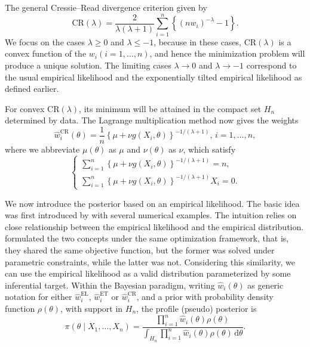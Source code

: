 \documentclass[oneside,english]{amsbook}
\numberwithin{section}{chapter}
\numberwithin{equation}{section}
\numberwithin{figure}{section}
\theoremstyle{plain}
\theoremstyle{plain}
\theoremstyle{definition}
\theoremstyle{plain}
\theoremstyle{plain}
\theoremstyle{remark}
\theoremstyle{definition}
\theoremstyle{definition}
\newcommand{\diff}{\,\mathrm{d}}
\begin{document}
The general Cressie--Read divergence criterion given by 
\[
\mathrm{CR}\left(\lambda\right)=\frac{2}{\lambda\left(\lambda+1\right)}\sum_{i=1}^{n}\left\{ \left(nw_{i}\right)^{-\lambda}-1\right\} .
\]
We focus on the cases $\lambda\ge0$ and $\lambda\le-1$, because
in these cases, $\mathrm{CR}\left(\lambda\right)$ is a convex function
of the $w_{i}\left(i=1,\ldots,n\right)$, and hence the minimization problem will produce a unique solution.  The limiting cases $\lambda\rightarrow0$
and $\lambda\rightarrow-1$ correspond to the usual empirical likelihood
and the exponentially tilted empirical likelihood as defined earlier. 

For convex $\mathrm{CR}\left(\lambda\right)$, its minimum will be
attained in the compact set $H_{n}$ determined by data. The Lagrange
multiplication method now gives the weights 
\begin{equation}
\hat{w}_{i}^{\mathrm{CR}}\left(\theta\right)=\frac{1}{n}\left\{ \mu+\nu g\left(X_{i},\theta\right)\right\} ^{-1/(\lambda+1)},\, i=1,\ldots,n,\label{eq:weight-cr-el}
\end{equation}
where we abbreviate $\mu\left(\theta\right)$ as $\mu$ and $\nu\left(\theta\right)$ as $\nu$, which
satisfy 
\begin{equation}
\begin{cases}
\sum_{i=1}^{n}\left\{ \mu+\nu g\left(X_{i},\theta\right)\right\} ^{-1/(\lambda+1)}=n,\\
\sum_{i=1}^{n}\left\{ \mu+\nu g\left(X_{i},\theta\right)\right\} ^{-1/(\lambda+1)}X_{i}=0.
\end{cases}\label{eq:lag-mul-cr-el}
\end{equation}


We now introduce the posterior based on an empirical likelihood. The  basic idea was first introduced by \cite{lazar2003bayesian} with several numerical examples. The intuition relies on close relationship between the empirical likelihood and the empirical distribution. \cite{owen2010empirical} formulated the two concepts under the same optimization framework, that is, they shared the same objective function, but the former  was solved under parametric constraints, while the latter was not. Considering this similarity, we can use the empirical likelihood as a valid distribution parameterized by some inferential target. Within the Bayesian paradigm, writing
$\hat{w}_{i}\left(\theta\right)$ as generic notation for either $\hat{w}_{i}^{\mathrm{EL}}$,
$\hat{w}_{i}^{\mathrm{ET}}$ or $\hat{w}_{i}^{\mathrm{CR}}$, and a prior with probability density function $\rho\left(\theta\right)$,
with support in $H_{n}$, the profile (pseudo) posterior is  
\begin{equation}
\pi\left(\theta\mid X_{1},\ldots,X_{n}\right)=\frac{\prod_{i=1}^{n}\hat{w}_{i}\left(\theta\right)\rho\left(\theta\right)}{\int_{H_{n}}\prod_{i=1}^{n}\hat{w}_{i}\left(\theta\right)\rho\left(\theta\right)\diff\theta}.\label{eq:poster-el-expression}
\end{equation}
\end{document}
